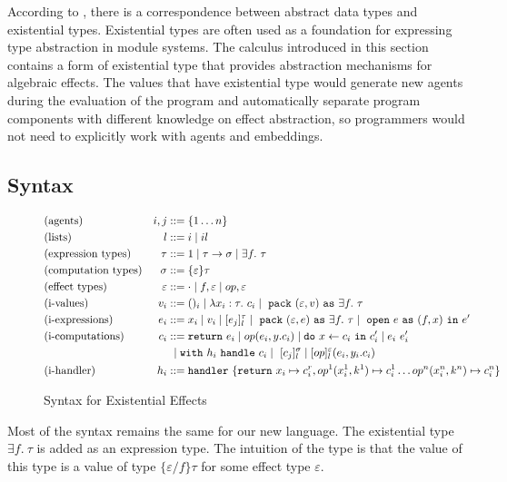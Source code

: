 According to \citet{mitchell88}, there is a correspondence between abstract data types and existential types. Existential types are often used as a foundation for expressing type abstraction in module systems. The  calculus introduced in this section contains a form of existential type that provides abstraction mechanisms for algebraic effects.  The values that have existential type would generate new agents during the evaluation of the program and automatically separate program components with different knowledge on effect abstraction, so programmers would not need to explicitly work with agents and embeddings.

\subsection{Syntax}
\begin{figure}
\label{fig-syntax}
\begin{align*}
&\text{(agents)} &i, j &::= \{1 \dots n\}\\
&\text{(lists)} & l &::= i \mid il\\
&\text{(expression types)} &\tau &::= 1 \mid \tau \rightarrow \sigma \mid \exists f.\ \tau \\
&\text{(computation types)} &\sigma &::= \{\varepsilon\}\tau\\
&\text{(effect types)} &\varepsilon &::= \cdot \mid f, \varepsilon \mid op, \varepsilon\\
&\text{(i-values)} &{v_i} &::= ()_i \mid \lambda x_i:\tau.\ c_i \mid \m{pack} (\varepsilon, v) \m{as} \exists f.\ \tau\\
&\text{(i-expressions)} &e_i &::= x_i \mid v_i \mid [e_j]^\tau_l \mid \m{pack} (\varepsilon, e) \m{as} \exists f.\ \tau  \mid \m{open} e \m{as} (f, x) \m{in} e'\\
&\text{(i-computations)} &c_i &::= \texttt{return}\ e_i \mid op(e_i, y.c_i) \mid \texttt{do}\ x \leftarrow c_i\ \texttt{in}\ c_i' \mid e_i\ e_i' \\
 &\ &\ &\ \mid \texttt{with}\ h_i\ \texttt{handle}\ c_i \mid\ [c_j]^\sigma_l \mid [op]^\varepsilon_l (e_i, y_i.c_i)\\
&\text{(i-handler)} &h_i &::= \texttt{handler}\ \{\texttt{return}\ x_i \mapsto c^r_i, op^1(x_i^1, k^1) \mapsto c_i^1 \dots  op^n(x_i^n, k^n) \mapsto c_i^n\}  
\end{align*}
\caption{Syntax for Existential Effects}
\end{figure}

Most of the syntax remains the same for our new language. The existential type $\exists f.\ \tau$ is added as an expression type. The intuition of the type is that the value of this type is a value of type $\{\varepsilon/f\}\tau$ for some effect type $\varepsilon$. 

